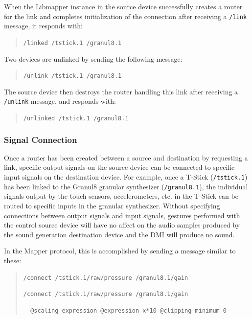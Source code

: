 When the Libmapper instance in the source device successfully creates a router for the link and completes initialization of the connection after receiving a \verb#/link# message, it responds with:

\begin{quote}
\verb#/linked /tstick.1 /granul8.1#
\end{quote}

Two devices are unlinked by sending the following message:

\begin{quote}
\verb#/unlink /tstick.1 /granul8.1#
\end{quote}

The source device then destroys the router handling this link after receiving a \verb#/unlink# message, and responds with:

\begin{quote}
\verb#/unlinked /tstick.1 /granul8.1#
\end{quote}

\subsubsection{Signal Connection}

Once a router has been created between a source and destination by requesting a link, specific output signals on the source device can be connected to specific input signals on the destination device. For example, once a T-Stick \cite{tstick2007} (\verb#/tstick.1#) has been linked to the Granul8 granular synthesizer (\verb#/granul8.1#), the individual signals output by the touch sensors, accelerometers, etc. in the T-Stick can be routed to specific inputs in the granular synthesizer. Without specifying connections between output signals and input signals, gestures performed with the control source device will have no affect on the audio samples produced by the sound generation destination device and the DMI will produce no sound. 

In the Mapper protocol, this is accomplished by sending a message similar to these:

\begin{quote}
\verb#/connect /tstick.1/raw/pressure /granul8.1/gain#

\verb#/connect /tstick.1/raw/pressure /granul8.1/gain#

\verb#  @scaling expression @expression x*10 @clipping minimum 0#
\end{quote}

